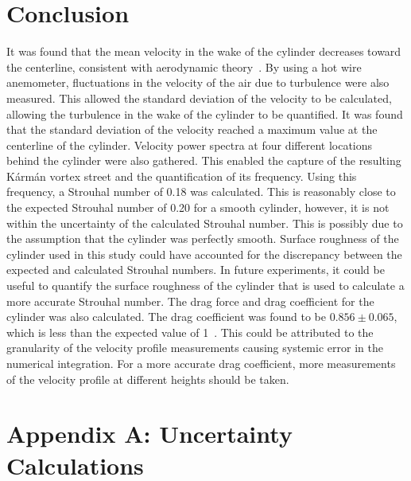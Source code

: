 \documentclass[journal,letterpaper]{IEEEtran}
\begin{document}
\section{Conclusion}


It was found that the mean velocity in the wake of the cylinder decreases toward the centerline, consistent with aerodynamic theory~\cite{lab3doc}.
By using a hot wire anemometer, fluctuations in the velocity of the air due to turbulence were also measured.
This allowed the standard deviation of the velocity to be calculated, allowing the turbulence in the wake of the cylinder to be quantified.
It was found that the standard deviation of the velocity reached a maximum value at the centerline of the cylinder.
Velocity power spectra at four different locations behind the cylinder were also gathered.
This enabled the capture of the resulting Kármán vortex street and the quantification of its frequency.
Using this frequency, a Strouhal number of 0.18 was calculated.
This is reasonably close to the expected Strouhal number of 0.20 for a smooth cylinder, however, it is not within the uncertainty of the calculated Strouhal number.
This is possibly due to the assumption that the cylinder was perfectly smooth.
Surface roughness of the cylinder used in this study could have accounted for the discrepancy between the expected and calculated Strouhal numbers.
In future experiments, it could be useful to quantify the surface roughness of the cylinder that is used to calculate a more accurate Strouhal number.
The drag force and drag coefficient for the cylinder was also calculated.
The drag coefficient was found to be $0.856 \pm 0.065$, which is less than the expected value of 1~\cite{dragRef}.
This could be attributed to the granularity of the velocity profile measurements causing systemic error in the numerical integration.
For a more accurate drag coefficient, more measurements of the velocity profile at different heights should be taken.


\section*{Appendix A: Uncertainty Calculations}
\end{document}

